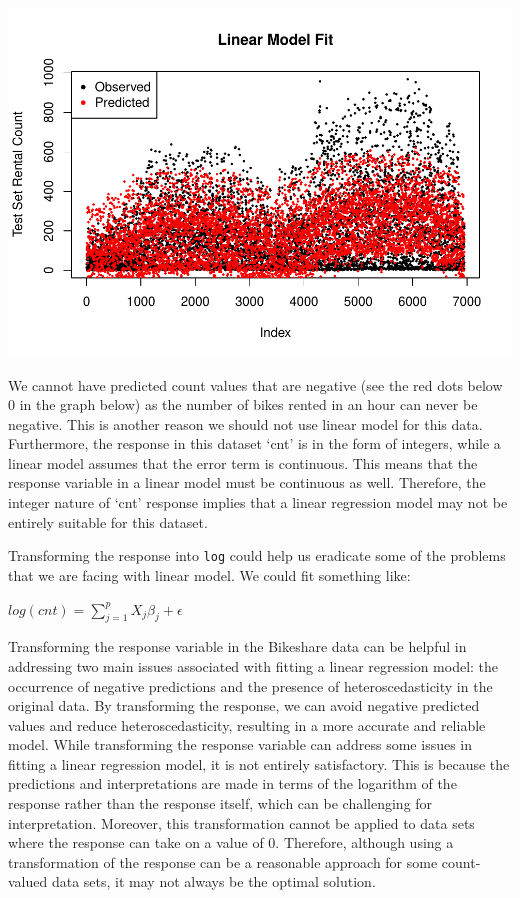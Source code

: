 \documentclass[
]{article}
\begin{document}
\includegraphics{draft_files/figure-latex/unnamed-chunk-8-1.pdf}

We cannot have predicted count values that are negative (see the red
dots below 0 in the graph below) as the number of bikes rented in an
hour can never be negative. This is another reason we should not use
linear model for this data. Furthermore, the response in this dataset
`cnt' is in the form of integers, while a linear model assumes that the
error term is continuous. This means that the response variable in a
linear model must be continuous as well. Therefore, the integer nature
of `cnt' response implies that a linear regression model may not be
entirely suitable for this dataset.

Transforming the response into \texttt{log} could help us eradicate some
of the problems that we are facing with linear model. We could fit
something like:

\(log(cnt) = \sum\limits_{j=1} ^ {p} X_{j}\beta_{j} + \epsilon\)

Transforming the response variable in the Bikeshare data can be helpful
in addressing two main issues associated with fitting a linear
regression model: the occurrence of negative predictions and the
presence of heteroscedasticity in the original data. By transforming the
response, we can avoid negative predicted values and reduce
heteroscedasticity, resulting in a more accurate and reliable model.
While transforming the response variable can address some issues in
fitting a linear regression model, it is not entirely satisfactory. This
is because the predictions and interpretations are made in terms of the
logarithm of the response rather than the response itself, which can be
challenging for interpretation. Moreover, this transformation cannot be
applied to data sets where the response can take on a value of 0.
Therefore, although using a transformation of the response can be a
reasonable approach for some count-valued data sets, it may not always
be the optimal solution.
\end{document}
